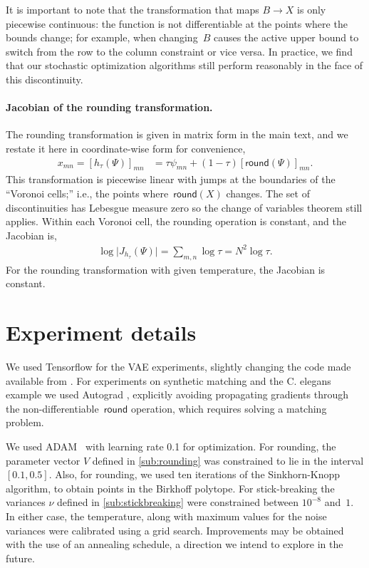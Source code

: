 It is important to note that the transformation that maps
$B \rightarrow X$ is only piecewise continuous: the function is not
differentiable at the points where the bounds change; for example,
when changing~$B$ causes the active upper bound to switch from the row
to the column constraint or vice versa.  In practice, we find
that our stochastic optimization algorithms still perform reasonably
in the face of this discontinuity.


\paragraph{Jacobian of the rounding transformation.}
The rounding transformation is given in matrix form
in the main text, and we restate it here in coordinate-wise form
for convenience,
\begin{align*}
  x_{mn} = [h_\tau(\Psi)]_{mn} &= \tau \psi_{mn} + (1-\tau) [\mathsf{round}(\Psi)]_{mn}.
\end{align*}
This transformation is piecewise linear with jumps at the boundaries
of the ``Voronoi cells;'' i.e., the points where~$\mathsf{round}(X)$
changes. The set of discontinuities has Lebesgue measure zero so the
change of variables theorem still applies.  Within each Voronoi cell,
the rounding operation is constant, and the Jacobian is,
\begin{align*}
  \log \big| J_{h_\tau}(\Psi) \big| = \sum_{m,n} \log \tau = N^2 \log \tau.
\end{align*}
For the rounding transformation with given temperature, the Jacobian
is constant.




\section{Experiment details}
We used Tensorflow \citep{Abadi2016} for the VAE experiments, slightly
changing the code made available from \cite{jang2016categorical}. For
experiments on synthetic matching and the C. elegans example we used
Autograd \citep{maclaurin2015autograd}, explicitly avoiding
propagating gradients through the non-differentiable~$\mathsf{round}$
operation, which requires solving a matching problem.

We used ADAM~\citep{kingma2014adam} with learning rate 0.1 for
optimization. For rounding, the parameter vector $V$ defined in
\ref{sub:rounding} was constrained to lie in the interval
$[0.1, 0.5]$. Also, for rounding, we used ten iterations of the
Sinkhorn-Knopp algorithm, to obtain points in the Birkhoff
polytope. For stick-breaking the variances $\nu$ defined in
\ref{sub:stickbreaking} were constrained between $10^{-8}$ and~$1$. In
either case, the temperature, along with maximum values for the noise
variances were calibrated using a grid search. Improvements may be obtained with the use of an annealing schedule, a direction we intend to explore in the future.
 

